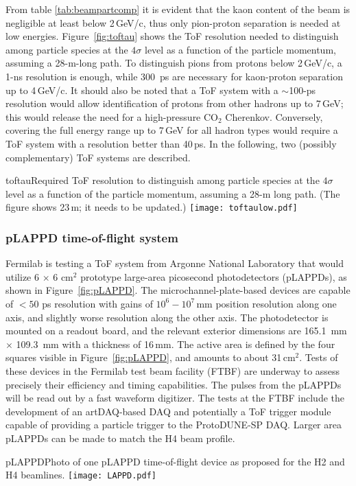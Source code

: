   From table \ref{tab:beampartcomp} it is evident that the kaon content of the beam is negligible at least below 2\,GeV/c, thus  only pion-proton separation is needed at low energies. Figure~\ref{fig:toftau} shows the ToF resolution needed to distinguish among particle species at the $4\sigma$ level as a function of the particle momentum, assuming a 28-m-long path. To distinguish pions from protons below 2\,GeV/c, a 1-ns resolution is enough, while 300~ps are necessary for kaon-proton separation up to  4\,GeV/c. It should also be noted that a ToF system with a $\sim$100-ps resolution would allow identification of protons from other hadrons up to 7\,GeV; this would release the need for a %
  high-pressure CO$_2$ Cherenkov. %
  Conversely, covering %
  the full energy range up to 7\,GeV for all hadron  types would require a ToF system with a resolution better than 40\,ps. %
In the following, two (possibly complementary) ToF systems are described.
\begin{cdrfigure}{toftau}{Required ToF resolution to  distinguish among particle species at the $4\sigma$ level as a function of the particle momentum, assuming a 28-m long path. (The figure shows 23\,m; it needs to be updated.) }
\texttt{[image: toftaulow.pdf]}
\end{cdrfigure}

\subsubsection{pLAPPD time-of-flight system}
Fermilab is testing a ToF system from Argonne National Laboratory that would utilize  
6 $\times$ 6 cm$^2$ prototype
large-area picosecond photodetectors (pLAPPDs), as shown in Figure~\ref{fig:pLAPPD}.
 The microchannel-plate-based devices
are capable of $<50$ ps resolution with gains of $10^6-10^7$\,mm 
position resolution along one axis, and slightly worse resolution
along the other axis.  The photodetector is mounted on a readout
board, and the relevant exterior dimensions are 165.1~mm $\times$ 109.3~mm with a
thickness of 16\,mm. The active area is defined by the four squares visible in Figure~\ref{fig:pLAPPD}, and amounts to about 31\,cm$^2$. Tests of these devices in the Fermilab test beam facility (FTBF) are underway to assess precisely their efficiency and timing capabilities. %
The pulses from the pLAPPDs will be read out by a fast waveform digitizer. The tests at the FTBF include the development of an artDAQ-based DAQ and potentially a ToF trigger module capable of providing a particle trigger to the ProtoDUNE-SP DAQ.
Larger area pLAPPDs can be made to match the H4 beam profile.
\begin{cdrfigure}{pLAPPD}{Photo of one pLAPPD  time-of-flight device as proposed for the H2 and H4 beamlines.}
\texttt{[image: LAPPD.pdf]}
\end{cdrfigure}

